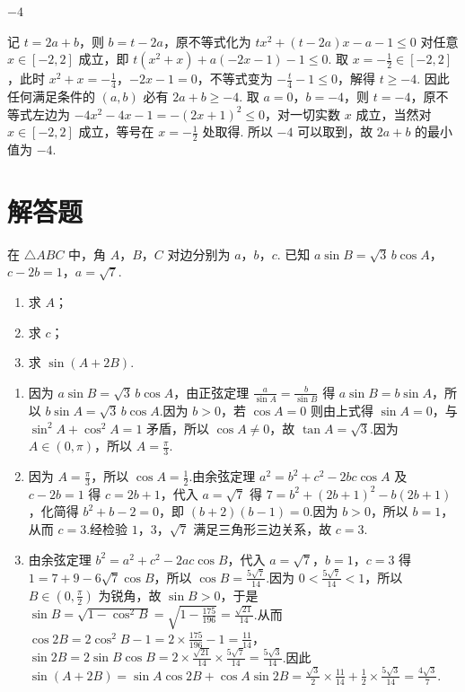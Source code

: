 \begin{answer}
\(-4\)
\end{answer}

\begin{solution}
记 \(t=2a+b\)，则 \(b=t-2a\)，原不等式化为 \(tx^{2}+(t-2a)x-a-1\le 0\) 对任意 \(x\in[-2,2]\) 成立，即 \(t(x^{2}+x)+a(-2x-1)-1\le 0\). 取 \(x=-\frac12\in[-2,2]\)，此时 \(x^{2}+x=-\frac14\)，\(-2x-1=0\)，不等式变为 \(-\frac{t}{4}-1\le 0\)，解得 \(t\ge -4\). 因此任何满足条件的 \((a,b)\) 必有 \(2a+b\ge -4\). 取 \(a=0\)，\(b=-4\)，则 \(t=-4\)，原不等式左边为 \(-4x^{2}-4x-1=-(2x+1)^{2}\le 0\)，对一切实数 \(x\) 成立，当然对 \(x\in[-2,2]\) 成立，等号在 \(x=-\frac12\) 处取得. 所以 \(-4\) 可以取到，故 \(2a+b\) 的最小值为 \(-4\).
\end{solution}
\section{解答题}

\begin{problem}
在 \(\triangle ABC\) 中，角 \(A\)，\(B\)，\(C\) 对边分别为 \(a\)，\(b\)，\(c\). 已知 \(a\sin B=\sqrt3\,b\cos A\)，\(c-2b=1\)，\(a=\sqrt7\).
\begin{enumerate}
    \item 求 \(A\)；
    \item 求 \(c\)；
    \item 求 \(\sin(A+2B)\).
\end{enumerate}
\end{problem}

\begin{solution}
\begin{enumerate}
\item 因为 \(a\sin B=\sqrt3\,b\cos A\)，由正弦定理 \(\frac{a}{\sin A}=\frac{b}{\sin B}\) 得 \(a\sin B=b\sin A\)，所以 \(b\sin A=\sqrt3\,b\cos A\).因为 \(b>0\)，若 \(\cos A=0\) 则由上式得 \(\sin A=0\)，与 \(\sin^2 A+\cos^2 A=1\) 矛盾，所以 \(\cos A\ne 0\)，故 \(\tan A=\sqrt3\).因为 \(A\in\left(0,\pi\right)\)，所以 \(A=\frac{\pi}{3}\).
\item 因为 \(A=\frac{\pi}{3}\)，所以 \(\cos A=\frac{1}{2}\).由余弦定理 \(a^2=b^2+c^2-2bc\cos A\) 及 \(c-2b=1\) 得 \(c=2b+1\)，代入 \(a=\sqrt7\) 得 \(7=b^2+\left(2b+1\right)^2-b\left(2b+1\right)\)，化简得 \(b^2+b-2=0\)，即 \(\left(b+2\right)\left(b-1\right)=0\).因为 \(b>0\)，所以 \(b=1\)，从而 \(c=3\).经检验 \(1\)，\(3\)，\(\sqrt7\) 满足三角形三边关系，故 \(c=3\).
\item 由余弦定理 \(b^2=a^2+c^2-2ac\cos B\)，代入 \(a=\sqrt7\)，\(b=1\)，\(c=3\) 得 \(1=7+9-6\sqrt7\cos B\)，所以 \(\cos B=\frac{5\sqrt7}{14}\).因为 \(0<\frac{5\sqrt7}{14}<1\)，所以 \(B\in\left(0,\frac{\pi}{2}\right)\) 为锐角，故 \(\sin B>0\)，于是 \(\sin B=\sqrt{1-\cos^2 B}=\sqrt{1-\frac{175}{196}}=\frac{\sqrt{21}}{14}\).从而 \(\cos 2B=2\cos^2 B-1=2\times\frac{175}{196}-1=\frac{11}{14}\)，\(\sin 2B=2\sin B\cos B=2\times\frac{\sqrt{21}}{14}\times\frac{5\sqrt7}{14}=\frac{5\sqrt3}{14}\).因此 \(\sin\left(A+2B\right)=\sin A\cos 2B+\cos A\sin 2B=\frac{\sqrt3}{2}\times\frac{11}{14}+\frac12\times\frac{5\sqrt3}{14}=\frac{4\sqrt3}{7}\).
\end{enumerate}
\end{solution}

